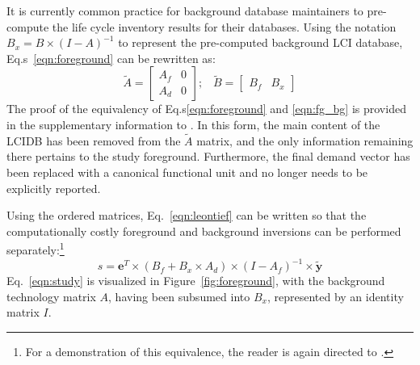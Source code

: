 It is currently common practice for background database maintainers to pre-compute the life cycle inventory results for their databases.  Using the notation $B_x = B \times (I - A)^{-1}$ to represent the pre-computed background LCI database, Eq.s~\ref{eqn:foreground} can be rewritten as:
\begin{equation}
 \tilde{A} = \left[\begin{array}{cc} 
A_f &  0 \\
A_d & 0 
   \end{array}\right];\;\;\;  \tilde{B} = \left[\begin{array}{cc} B_f & B_x \end{array}\right ]
\label{eqn:fg_bg}
\end{equation}
The proof of the equivalency of Eq.s\ref{eqn:foreground} and \ref{eqn:fg_bg} is provided in the supplementary information to \cite{Kuczenski_JLCA_2015}.  In this form, the main content of the LCIDB has been removed from the $\tilde{A}$ matrix, and the only information remaining there pertains to the study foreground.  Furthermore, the final demand vector has been replaced with a canonical functional unit and no longer needs to be explicitly reported.

Using the ordered matrices, Eq.~\ref{eqn:leontief} can be written so that the computationally costly foreground and background inversions can be performed separately:\footnote{For a demonstration of this equivalence, the reader is again directed to \cite{Kuczenski_JLCA_2015}.}
\begin{equation}
s = \mathbf{e}^T \times (B_f + B_x\times A_d) \times (I - A_f)^{-1} \times \tilde{\mathbf{y}}
\label{eqn:study}
\end{equation}
Eq.~\ref{eqn:study} is visualized in Figure~\ref{fig:foreground}, with the background technology matrix $A$, having been subsumed into $B_x$, represented by an identity matrix $I$.  

